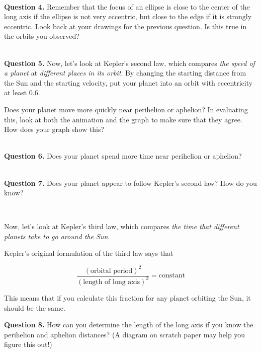 \documentclass[11pt]{article}
\begin{document}
\vspace{1.5cm}
\hrulefill\\

\textbf {Question 4.} Remember that the focus of an ellipse is close to the center of the long axis if the ellipse is not very eccentric, but close to the edge if it is strongly eccentric. Look back at your drawings for the previous question. Is this true in the orbits you observed?

\vspace{1.5cm}
\hrulefill\\

\textbf {Question 5.} Now, let's look at Kepler's second law, which compares {\it the speed of a planet} at {\it different places in its orbit}. By changing the starting distance from the Sun and the starting velocity, put your planet into an orbit with eccentricity at least 0.6.

Does your planet move more quickly near perihelion or aphelion? In evaluating this, look at both the animation and the graph to make sure that they agree. How does your graph show this?

\vspace{1.5cm}
\hrulefill\\

\textbf {Question 6.} Does your planet spend more time near perihelion or aphelion?

\vspace{1.5cm}
\hrulefill\\


\textbf {Question 7.} Does your planet appear to follow Kepler's second law? How do you know?

\vspace{1.5cm}
\hrulefill\\


\newpage

Now, let's look at Kepler's third law, which compares {\it the time that different planets take to go around the Sun}.

Kepler's original formulation of the third law says that

$$
\frac{(\mbox{orbital period})^2}{(\mbox{length of long axis})^3} = \mbox{constant}
$$

This means that if you calculate this fraction for any planet orbiting the Sun, it should be the same.

\textbf {Question 8.} How can you determine the length of the long axis if you know the perihelion and aphelion distances? (A diagram on scratch paper may help you figure this out!)
\end{document}
